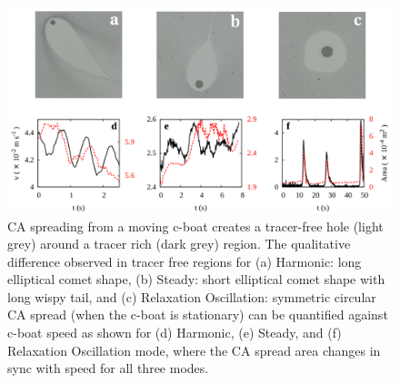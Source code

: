 \documentclass[journal=langd5, manuscript=article, layout=twocolumn]{achemso}
\begin{document}
\begin{figure}[ht] 
    \centering
       \includegraphics[width=\textwidth]{figure3_v2.pdf}
    \caption{CA spreading from a moving c-boat creates a tracer-free hole (light grey) around a tracer rich (dark grey) region. The qualitative difference observed in tracer free regions for (a) Harmonic: long elliptical comet shape, (b) Steady: short elliptical comet shape with long wispy tail, and (c) Relaxation Oscillation: symmetric circular CA spread (when the c-boat is stationary) can be quantified against c-boat speed as shown for (d) Harmonic, (e) Steady, and (f) Relaxation Oscillation mode, where the CA spread area changes in sync with speed for all three modes. }
    \label{fig3}
\end{figure}
\end{document}
